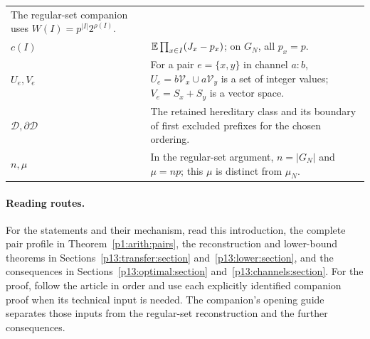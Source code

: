 \begin{center}
\begin{tabularx}{\textwidth}{@{}>{\raggedright\arraybackslash}p{}>{\raggedright\arraybackslash}X@{}}
The regular-set companion uses \(W(I)=p^{|I|}2^{\rho(I)}\).\\[3pt]
\(c(I)\)
& \(\mathbb E\prod_{x\in I}(J_x-p_x)\); on \(G_N\),
all \(p_x=p\).\\[3pt]
\(U_e,V_e\)
& For a pair \(e=\{x,y\}\) in channel \(a:b\),
\(U_e=b\mathcal V_x\cup a\mathcal V_y\) is a set
of integer values; \(V_e=S_x+S_y\) is a vector space.\\[3pt]
\(\mathscr D,\partial\mathscr D\)
& The retained hereditary class and its boundary of
first excluded prefixes for the chosen ordering.\\[3pt]
\(n,\mu\)
& In the regular-set argument, \(n=|G_N|\) and
\(\mu=np\); this \(\mu\) is distinct from \(\mu_N\).\\
\bottomrule
\end{tabularx}
\end{center}

\paragraph{Reading routes.}
For the statements and their mechanism, read this introduction,
the complete pair profile in Theorem~\ref{p1:arith:pairs},
the reconstruction and lower-bound theorems in
Sections~\ref{p13:transfer:section} and~\ref{p13:lower:section},
and the consequences in Sections~\ref{p13:optimal:section}
and~\ref{p13:channels:section}.
For the proof, follow the article in order and use each explicitly
identified companion proof when its technical input is needed.
The companion's opening guide separates those inputs from the
regular-set reconstruction and the further consequences.

